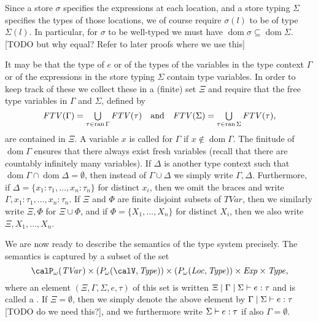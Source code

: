 \documentclass[a4paper, 11pt, article, danish, oneside]{memoir}
\DeclarePairedDelimiter{\auxdelimparen}{(}{)}
\newcommand{\powersetcard}[3][]{\calP_{#2}\auxdelimparen[#1]{#3}}
\newcommand{\powersetfin}[2][]{\powersetcard[#1]{\omega}{#2}}
\newcommand*\union\cup
\newcommand*\intersect\cap
\DeclareMathOperator*{\smallbigcup}{\textstyle\bigcup}
\DeclareMathOperator*{\bigunion}{\mathchoice
    {\smallbigcup}%
    {\bigcup}%
    {\bigcup}%
    {\bigcup}%
}
\newcommand{\dom}{\operatorname{dom}}
\newcommand{\ran}{\operatorname{ran}}
\renewcommand{\prod}{\times}
\newcommand{\setVar}{\calV}
\newcommand{\setTVar}{\mathit{TVar}}
\newcommand{\setLoc}{\mathit{Loc}}
\newcommand{\setExp}{\mathit{Exp}}
\newcommand{\setType}{\mathit{Type}}
\newcommand{\freeTvar}[1]{\mathit{FTV}(#1)}
\newcommand{\pmaps}[3][]{%
    \ifstrempty{#1}%
        {%
            P(#2,#3)
        }{%
            P_{#1}(#2,#3)
        }%
}
\begin{document}
Since a store $\sigma$ specifies the expressions at each location, and a store typing $\Sigma$ specifies the types of those locations, we of course require $\sigma(l)$ to be of type $\Sigma(l)$. In particular, for $\sigma$ to be well-typed we must have $\dom \sigma \subseteq \dom \Sigma$. [TODO but why equal? Refer to later proofs where we use this]

It may be that the type of $e$ or of the types of the variables in the type context $\Gamma$ or of the expressions in the store typing $\Sigma$ contain type variables. In order to keep track of these we collect these in a (finite) set $\Xi$ and require that the free type variables in $\Gamma$ and $\Sigma$, defined by
%
\begin{equation*}
    \freeTvar{\Gamma}
        = \bigunion_{\tau \in \ran \Gamma} \freeTvar{\tau}
    \quad \text{and} \quad
    \freeTvar{\Sigma}
        = \bigunion_{\tau \in \ran \Sigma} \freeTvar{\tau},
\end{equation*}
%
are contained in $\Xi$. A variable $x$ is called  for $\Gamma$ if $x \not\in \dom \Gamma$. The finitude of $\dom \Gamma$ ensures that there always exist fresh variables (recall that there are countably infinitely many variables). If $\Delta$ is another type context such that $\dom \Gamma \intersect \dom \Delta = \emptyset$, then instead of $\Gamma \union \Delta$ we simply write $\Gamma,\Delta$. Furthermore, if $\Delta = \{x_1 : \tau_1, \ldots, x_n : \tau_n\}$ for distinct $x_i$, then we omit the braces and write $\Gamma, x_1 : \tau_1, \ldots, x_n : \tau_n$. If $\Xi$ and $\Phi$ are finite disjoint subsets of $\setTVar$, then we similarly write $\Xi,\Phi$ for $\Xi \union \Phi$, and if $\Phi = \{X_1, \ldots, X_n\}$ for distinct $X_i$, then we also write $\Xi, X_1, \ldots, X_n$.

We are now ready to describe the semantics of the type system precisely. The semantics is captured by a subset of the set
%
\begin{equation*}
    \powersetfin{\setTVar}
        \prod (\pmaps[\omega]{\setVar}{\setType})
        \prod (\pmaps[\omega]{\setLoc}{\setType})
        \prod \setExp
        \prod \setType,
\end{equation*}
%
where an element $(\Xi,\Gamma,\Sigma,e,\tau)$ of this set is written $\hastype{\Xi}{\Gamma}{\Sigma}{e}{\tau}$ and is called a . If $\Xi = \emptyset$, then we simply denote the above element by $\hastype{}{\Gamma}{\Sigma}{e}{\tau}$ [TODO do we need this?], and we furthermore write $\hastype{}{}{\Sigma}{e}{\tau}$ if also $\Gamma = \emptyset$.
\end{document}
